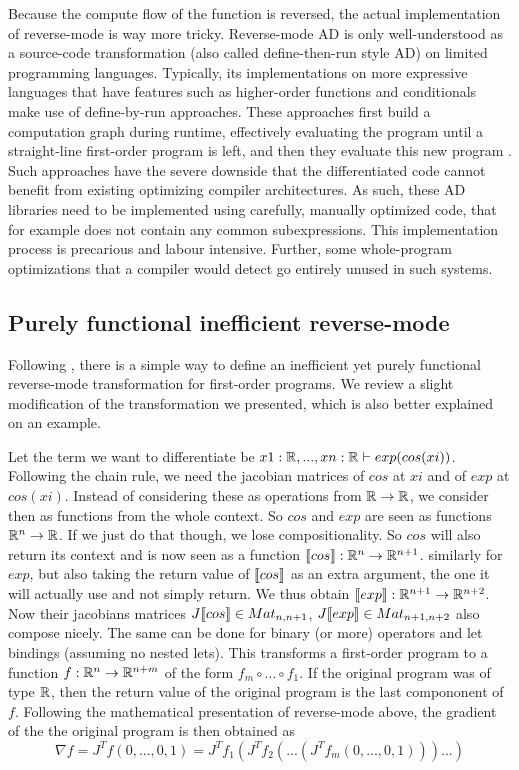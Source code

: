 Because the compute flow of the function is reversed, the actual implementation of reverse-mode is way more tricky. 
Reverse-mode AD is only well-understood as a source-code transformation (also called define-then-run
style AD) on limited programming languages. Typically, its implementations
on more expressive languages that have features such as higher-order functions and conditionals
make use of define-by-run approaches. These approaches first build a computation graph during runtime, effectively evaluating the program until a straight-line
first-order program is left, and then they evaluate this new program \cite{carpenter2015stan,paszke2017automatic}. 
Such approaches have the severe downside that the differentiated code cannot benefit from existing optimizing compiler architectures. As such, these AD libraries
need to be implemented using carefully, manually optimized code, that for example does not contain any common subexpressions. This implementation process
is precarious and labour intensive. Further, some whole-program optimizations
that a compiler would detect go entirely unused in such systems.

\subsection{Purely functional inefficient reverse-mode}

Following \cite{pearlmutter2008reverse}, there is a simple way to define an inefficient yet purely functional reverse-mode transformation for first-order programs.
We review a slight modification of the transformation we presented, which is also better explained on an example. 

Let the term we want to differentiate be $x1:\mathbb{R},...,xn:\mathbb{R}\vdash exp(cos(xi))$.
Following the chain rule, we need the jacobian matrices of $cos$ at $xi$ and of $exp$ at $cos(xi)$. 
Instead of considering these as operations from $\mathbb{R}\to\mathbb{R}$, we consider then as functions from the whole context. So $cos$ and $exp$ are seen as functions $\mathbb{R}^n\to\mathbb{R}$.
If we just do that though, we lose compositionality. 
So $cos$ will also return its context and is now seen as a function $\llbracket cos\rrbracket:\mathbb{R}^n\to\mathbb{R}^{n+1}$.
similarly for $exp$, but also taking the return value of $\llbracket cos\rrbracket$ as an extra argument, the one it will actually use and not simply return. 
We thus obtain $\llbracket exp\rrbracket:\mathbb{R}^{n+1}\to\mathbb{R}^{n+2}$. Now their jacobians matrices $J\llbracket cos\rrbracket \in Mat_{n,n+1}$, $J\llbracket exp\rrbracket \in Mat_{n+1,n+2}$ also compose nicely.
The same can be done for binary (or more) operators and let bindings (assuming no nested lets). 
This transforms a first-order program to a function $f:\mathbb{R}^n\to\mathbb{R}^{n+m}$ of the form $f_m\circ...\circ f_1$. 
If the original program was of type $\mathbb{R}$, then the return value of the original program is the last compononent of $f$.
Following the mathematical presentation of reverse-mode above, the gradient of the the original program is then obtained as 
\[\nabla f= J^Tf(0,...,0,1)=J^Tf_1(J^Tf_{2}(...(J^Tf_m(0,...,0,1)))...)\]

